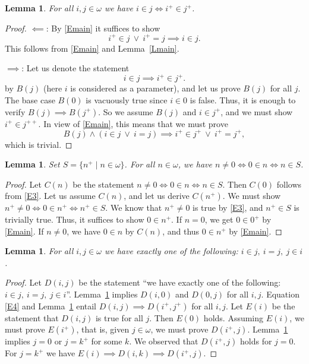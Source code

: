 \documentclass[12pt,letterpaper]{article}
\newtheorem{lem}[thm]{Lemma} %
\begin{document}
\begin{lem}\label{Lij++} 
For all \(i,j\in\omega\) we have \(i\in j\iff i^+\in j^+\). 
\end{lem} 
\begin{proof} 
\(\impliedby\): By \eqref{Emain} it suffices to show 
\[
i^+\in j\ \lor\ i^+=j\implies i\in j.
\] 
This follows from \eqref{Emain} and Lemma~\ref{Lmain}. 

\(\implies\): Let us denote the statement 
\[
i\in j\implies i^+\in j^+.
\] 
by \(B(j)\) (here \(i\) is considered as a parameter), and let us prove \(B(j)\) for all \(j\). The base case \(B(0)\) is vacuously true since \(i\in 0\) is false. Thus, it is enough to verify \(B(j)\implies B(j^+)\). So we assume \(B(j)\) and \(i\in j^+\), and we must show \(i^+\in j^{++}\). In view of \eqref{Emain}, this means that we must prove 
\[
B(j)\land(i\in j\ \lor\ i=j)\implies i^+\in j^+\ \lor\ i^+=j^+,
\] 
which is trivial. 
\end{proof} 

\begin{lem}\label{Ldicho} 
Set \(S=\{n^+\mid n\in\omega\}\). For all \(n\in\omega\), we have \(n\ne0\iff0\in n\iff n\in S\). 
\end{lem} 
\begin{proof} 
Let \(C(n)\) be the statement \(n\ne0\iff0\in n\iff n\in S\). Then \(C(0)\) follows from \eqref{E3}. Let us assume \(C(n)\), and let us derive \(C(n^+)\). We must show \(n^+\ne0\iff0\in n^+\iff n^+\in S\). We know that \(n^+\ne0\) is true by \eqref{E3}, and \(n^+\in S\) is trivially true. Thus, it suffices to show \(0\in n^+\). If \(n=0\), we get \(0\in0^+\) by \eqref{Emain}. If \(n\ne0\), we have \(0\in n\) by \(C(n)\), and thus \(0\in n^+\) by \eqref{Emain}. 
\end{proof} 

\begin{lem}\label{Ltricho} 
For all \(i,j\in\omega\) we have exactly one of the following: \(i\in j,\ i=j,\ j\in i\). 
\end{lem} 
\begin{proof} 
Let \(D(i,j)\) be the statement ``we have exactly one of the following: \(i\in j,\ i=j,\ j\in i\)''. Lemma~\ref{Ldicho} implies \(D(i,0)\) and \(D(0,j)\) for all \(i,j\). Equation \eqref{E4} and Lemma~\ref{Lij++} entail \(D(i,j)\implies D(i^+,j^+)\) for all \(i,j\). Let \(E(i)\) be the statement that \(D(i,j)\) is true for all \(j\). Then \(E(0)\) holds. Assuming \(E(i)\), we must prove \(E(i^+)\), that is, given \(j\in\omega\), we must prove \(D(i^+,j)\). Lemma~\ref{Ldicho} implies \(j=0\) or \(j=k^+\) for some \(k\). We observed that \(D(i^+,j)\) holds for \(j=0\). For \(j=k^+\) we have \(E(i)\implies D(i,k)\implies D(i^+,j)\). 
\end{proof} 
\end{document}
